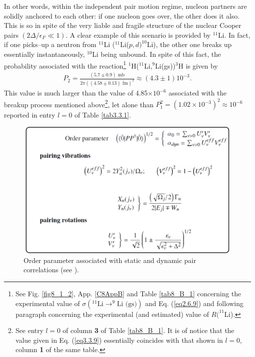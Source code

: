 In other words, within the independent pair motion regime, nucleon partners are solidly anchored to each other: if one nucleon goes over, the other does it also. This is so in spite of the very liable and fragile structure of the nuclear Cooper pairs $(2\Delta/\epsilon_F\ll1)$. A clear example of this scenario is  provided by $^{11}$Li. In fact, if one picks--up a neutron from $^{11}$Li ($^{11}$Li($p,d)^{10}$Li), the other one breaks up essentially instantaneously, $^{10}$Li being unbound. In spite of this fact, the probability associated with the reaction\footnote{See  Fig. \ref{fig8_1_2}, App. \ref{C8AppB} and Table \ref{tab8_B_1} concerning the experimental value of $\sigma(^{11}\text{Li}\to ^{9}\text{Li (gs)})$ and Eq. (\ref{eq2.6.9}) and following paragraph concerning the experimental (and estimated) value of $R(^{11}$Li).} $^1$H($^{11}$Li,$^9$Li(gs))$^{3}$H is given by
\begin{align}\label{eq3.3.9}
P_2=\frac{(5.7\pm0.9)\text{ mb}}{2\pi((4.58\pm0.13)\text{ fm})^2}\approx(4.3\pm1)10^{-3}.
\end{align}
This value is much larger than the value of 4.85$\times10^{-6}$ associated with the breakup process mentioned above\footnote{See entry $l=0$ of column \textbf{3} of Table \ref{tab8_B_1}. It is of notice that the value given in Eq. (\ref{eq3.3.9}) essentially coincides with that shown in $l=0$, column \textbf{1} of the same table.}, let alone than $P_1^2=(1.02\times10^{-3})^2\approx 10^{-6}$ reported in entry $l=0$ of Table \ref{tab3.3.1}.
\begin{figure}
\centerline{\includegraphics*[width=15cm,angle=0]{nutshell/figs/fig3_3_2.pdf}}
\caption{Order parameter associated with static and dynamic pair correlations (see \cite{Potel:13b}).}\label{fig3.3.2}
\end{figure}
